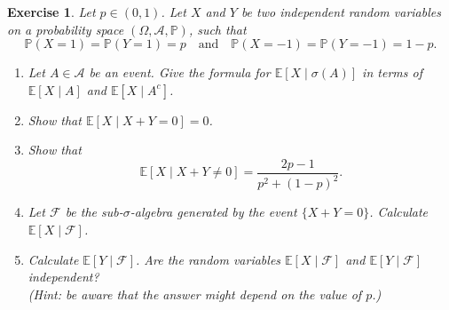 \documentclass{article}
\newtheorem{exercise}[theorem]{Exercise}
\begin{document}
\begin{exercise}
Let $p \in (0,1)$. Let $X$ and $Y$ be two independent random variables on a probability space $(\Omega, \mathcal{A}, \mathbb{P})$, such that
\[
\mathbb{P}(X = 1) = \mathbb{P}(Y = 1) = p \quad \text{and} \quad \mathbb{P}(X = -1) = \mathbb{P}(Y = -1) = 1 - p.
\]

\begin{enumerate}
    \item[(a)] Let $A \in \mathcal{A}$ be an event. Give the formula for $\mathbb{E}[X \mid \sigma(A)]$ in terms of $\mathbb{E}[X \mid A]$ and $\mathbb{E}[X \mid A^c]$.
    
    \item[(b)] Show that $\mathbb{E}[X \mid X + Y = 0] = 0$.
    
    \item[(c)] Show that
    \[
    \mathbb{E}[X \mid X + Y \neq 0] = \frac{2p - 1}{p^2 + (1 - p)^2}.
    \]
    
    \item[(d)] Let $\mathcal{F}$ be the sub-$\sigma$-algebra generated by the event $\{X + Y = 0\}$. Calculate $\mathbb{E}[X \mid \mathcal{F}]$.
    
    \item[(e)] Calculate $\mathbb{E}[Y \mid \mathcal{F}]$. Are the random variables $\mathbb{E}[X \mid \mathcal{F}]$ and $\mathbb{E}[Y \mid \mathcal{F}]$ independent?\\
    \textit{(Hint: be aware that the answer might depend on the value of $p$.)}
\end{enumerate}
\end{exercise}
\end{document}
